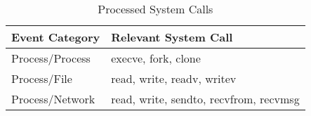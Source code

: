 \begin{table}[t]
\caption{Processed System Calls}
\centering
\begin{adjustbox}{width=0.45\textwidth}

\begin{tabular}{|l|l|}
\hline
 \textbf{Event Category}&  \textbf{Relevant System Call}\\ \hline
Process/Process & execve, fork, clone  \\ \hline
Process/File & read, write, readv, writev  \\ \hline
Process/Network & read, write, sendto, recvfrom, recvmsg \\ \hline
\end{tabular}
\end{adjustbox}
\label{tab:events}
\end{table}